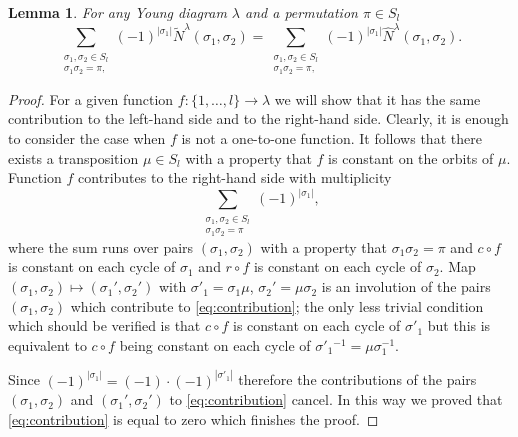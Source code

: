 \documentclass[12pt]{amsart}
\theoremstyle{plain}
\newtheorem{lemma}{Lemma}
\theoremstyle{remark}
\begin{document}
\begin{lemma}
\label{lem:kasowanie}
For any Young diagram $\lambda$ and a permutation $\pi\in S_l$
\begin{equation}
\label{eq:stanley-feray-sniady-2}
\sum_{\substack{\sigma_1,\sigma_2\in S_l\\ \sigma_1 \sigma_2=\pi,}}
  (-1)^{|\sigma_1|} \tilde{N}^{\lambda}(\sigma_1,\sigma_2)=
\sum_{\substack{\sigma_1,\sigma_2\in S_l\\ \sigma_1 \sigma_2=\pi,}}
  (-1)^{|\sigma_1|} \hat{N}^{\lambda}(\sigma_1,\sigma_2).
\end{equation}
\end{lemma}
\begin{proof}
For a given function $f:\{1,\dots,l\}\rightarrow \lambda$ we will show that it
has the same contribution to the left-hand side and to the right-hand side.
Clearly, it is enough to consider the case when $f$ is not a one-to-one
function. It follows that there exists a transposition $\mu\in S_l$ with a
property that $f$ is
constant on the orbits of $\mu$.
Function $f$ contributes to the right-hand side
with multiplicity
\begin{equation}
\label{eq:contribution}
 \sum_{\substack{\sigma_1,\sigma_2\in S_l\\ \sigma_1 \sigma_2=\pi}} (-1)^{|\sigma_1|},
\end{equation}
where the sum runs over pairs $(\sigma_1,\sigma_2)$ with a property that $\sigma_1 \sigma_2=\pi$
and
$c\circ f$ is constant on each cycle of $\sigma_1$ and 
$r\circ f$ is constant on each cycle of $\sigma_2$.
Map $(\sigma_1,\sigma_2)\mapsto (\sigma_1', \sigma_2')$ with $\sigma'_1=\sigma_1
\mu$,
$\sigma_2'=\mu \sigma_2$ is an involution of
the pairs $(\sigma_1,\sigma_2)$ which contribute to \eqref{eq:contribution};
the only less trivial condition which should be verified is that
$c\circ f$ is constant on each cycle of $\sigma'_1$ but this is equivalent to
$c\circ f$ being constant on each cycle of $\sigma'_1{}^{-1}=\mu \sigma_1^{-1}$.


Since $(-1)^{|\sigma_1|}= (-1)\cdot (-1)^{|\sigma'_1|}$ therefore the contributions
of the pairs $(\sigma_1,\sigma_2)$ and $(\sigma_1',\sigma_2')$
to \eqref{eq:contribution} cancel. In this way we proved that \eqref{eq:contribution} is 
equal to zero which finishes the proof.
\end{proof}
\end{document}
